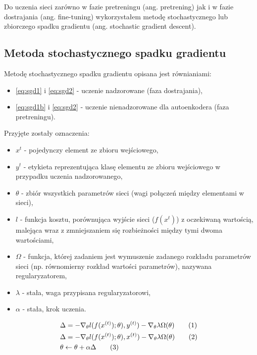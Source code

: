 \documentclass[fleqn]{scrartcl}
\newcommand\numberthis{\addtocounter{equation}{1}\tag{\theequation}}
\begin{document}
Do uczenia sieci zarówno w fazie pretreningu (ang. pretrening) jak i w fazie dostrajania (ang. fine-tuning) wykorzystałem metodę stochastycznego lub zbiorczego spadku gradientu (ang. stochastic gradient descent).


\subsection{Metoda stochastycznego spadku gradientu}
Metodę stochastycznego spadku gradientu opisana jest równianiami:
\begin{itemize}
    \item  \ref{eq:sgd1} i \ref{eq:sgd2}  - uczenie nadzorowane (faza dostrajania),
    \item  \ref{eq:sgd1b} i \ref{eq:sgd2} - uczenie nienadzorowane dla autoenkodera (faza pretreningu).
\end{itemize}

Przyjęte zostały oznaczenia:
\begin{itemize}
    \item $x^{t}$ - pojedynczy element ze zbioru wejściowego,
    \item $y^{t}$ - etykieta reprezentująca klasę elementu ze zbioru wejściowego w przypadku uczenia nadzorowanego,
    \item $\theta$ - zbiór wszystkich parametrów sieci (wagi połączeń między elementami w sieci),
    \item $l$ - funkcja kosztu, porównująca wyjście sieci ($f(x^{t})$) z oczekiwaną wartością, malejąca wraz z zmniejszaniem się rozbieżności między tymi dwoma wartościami, 
    \item $\Omega$ - funkcja, której zadaniem jest wymuszenie zadanego rozkładu parametrów sieci (np. równomierny rozkład wartości parametrów), nazywana regularyzatorem,
    \item $\lambda$ - stała, waga przypisana regularyzatorowi, 
    \item $\alpha$ - stała, krok uczenia.
\end{itemize}

\begin{align*}
    &\Delta = - \nabla_{\theta} l(f(x^{(t)}); \theta ),  
        y^{(t)}) - \nabla_{\theta}  \lambda \Omega(\theta ) \numberthis \label{eq:sgd1}\\
    &\Delta = - \nabla_{\theta} l(f(x^{(t)}); \theta ),  
        x^{(t)}) - \nabla_{\theta}  \lambda \Omega(\theta ) \numberthis \label{eq:sgd1b}\\
    &\theta \leftarrow  \theta + \alpha \Delta          \numberthis \label{eq:sgd2}
\end{align*}
\end{document}
